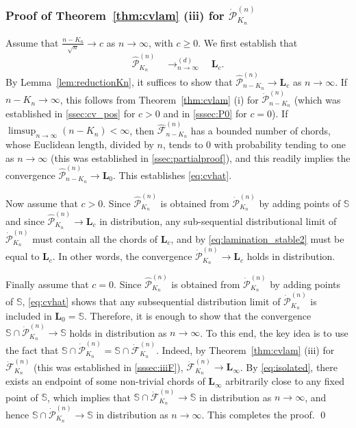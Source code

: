 \documentclass[AHL,XML,longabstracts,Unicode]{cedram}
\def\S{\mathbb{S}}
\def\PPP{\mathcal P}
\def\FFF{\mathcal F}
\def\dFKn{\dot{\mathcal{F}}^{(n)}_{K_{n}}}
\def\dPKn{\dot{\mathcal{P}}^{(n)}_{K_{n}}}
\begin{document}
\subsubsection{Proof of  Theorem~\ref{thm:cvlam} (iii) for $ \dPKn$}
\label{sssec:iiiP}
Assume that $ \frac{n-K_{n}}{\sqrt{n}} \rightarrow c$ as $n \rightarrow \infty$, with $c \geq  0$.
We first establish that
\begin{equation}
\label{eq:cvhat} \hat{\PPP}^{(n)}_{K_{n}}  \quad \mathop{\longrightarrow}^{(d)}_{n \rightarrow \infty} \quad \mathbf{L}_{c}.
\end{equation}
By Lemma~\ref{lem:reductionKn}, it suffices to show that $ \hat{\PPP}^{(n)}_{n-K_{n}} \rightarrow \mathbf{L}_{c}$ as $n \rightarrow \infty$. If $n-K_{n} \rightarrow \infty$,  this follows from Theorem~\ref{thm:cvlam} (i) for $\dot{\PPP}^{(n)}_{n-K_{n}}$ (which was established in \cref{ssec:cv_pos} for $c>0$ and in \cref{sssec:P0} for $c=0$). If $ \limsup_{n \rightarrow \infty} (n-K_{n})<\infty$, then   $ \hat{\FFF}^{(n)}_{n-K_{n}}$ has a bounded number of chords, whose Euclidean length, divided by $n$, tends to $0$ with probability tending to one as $n \rightarrow \infty$ (this was established in \cref{ssec:partialproof}), and this readily implies the convergence $ \hat{\PPP}^{(n)}_{n-K_{n}} \rightarrow \mathbf{L}_{0}$. This establishes \eqref{eq:cvhat}.


Now assume that $c>0$. Since $\hat{\mathcal{P}}^{(n)}_{K_{n}}$ is obtained from  $\dPKn$ by adding points of $\S$ and since $\hat{\mathcal{P}}^{(n)}_{K_{n}} \rightarrow \mathbf{L}_{c}$ in distribution, any sub-sequential distributional limit of $\dPKn$ must contain all the chords of $\mathbf{L}_{c}$, and by \eqref{eq:lamination_stable2} must be equal to $\mathbf{L}_{c}$. In other words, the convergence $\dPKn \rightarrow  \mathbf{L}_{c}$ holds in distribution.

Finally assume that $c=0$.  Since $\hat{\mathcal{P}}^{(n)}_{K_{n}}$ is obtained from  $\dPKn$ by adding points of $\S$, \eqref{eq:cvhat} shows that any subsequential distribution limit of $\dPKn$ is included in $\mathbf{L}_{0}=\S$. Therefore, it is enough to show that the convergence $\S \cap \dPKn \rightarrow \S$  holds in distribution as $n \rightarrow \infty$. To this end, the key idea is to use the fact that $\S \cap \dPKn=\S \cap \dFKn$. Indeed, by  Theorem~\ref{thm:cvlam} (iii) for $ \dFKn$ (this was established in \cref{sssec:iiiF}), $\dot{\mathcal{F}}^{(n)}_{K_{n}} \rightarrow \mathbf{L}_{\infty}$. By \eqref{eq:isolated},
there exists an endpoint of some non-trivial chords of $\mathbf{L}_{\infty}$ arbitrarily close to any fixed point of $\S$,
which implies that   $\S \cap \dot{\mathcal{F}}^{(n)}_{K_{n}} \rightarrow \S$ in distribution as $n \rightarrow \infty$, and hence  $\S \cap \dot{\mathcal{P}}^{(n)}_{K_{n}} \rightarrow \S$ in distribution as $n \rightarrow \infty$. This completes the proof.
\qed
\medskip
\end{document}
